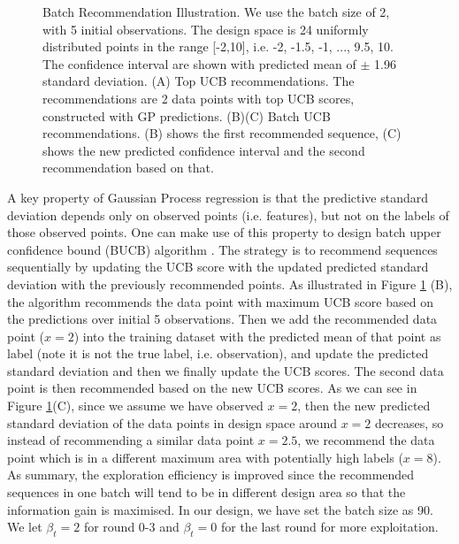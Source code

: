 \begin{figure}
\begin{subfigure}[b]{0.49\textwidth}
    \end{subfigure}
    \caption{Batch Recommendation Illustration. We use the batch size of 2, with 5 initial observations. The design space is 24 uniformly distributed points in the range [-2,10], i.e. {-2, -1.5, -1, ..., 9.5, 10}.
    The confidence interval are shown with predicted mean of $\pm$ 1.96 standard deviation.
    (A) Top UCB recommendations. The recommendations are 2 data points with top UCB scores, constructed with GP predictions. 
    (B)(C) Batch UCB recommendations. (B) shows the first recommended sequence, (C) shows the new predicted confidence interval and the second recommendation based on that.}
    \label{fig:batch rec}
\end{figure}


A key property of Gaussian Process regression is that the predictive standard deviation depends only on observed points (i.e. features), but not on the labels of those observed points. 
One can make use of this property to design batch upper confidence bound (BUCB) algorithm \cite{desautels2014parallelizing}.
The strategy is to recommend sequences sequentially by updating the UCB score with the updated predicted standard deviation with the previously recommended points.
As illustrated in Figure \ref{fig:batch rec} (B), the algorithm recommends the data point with maximum UCB score based on the predictions over initial 5 observations.  
Then we add the recommended data point ($x = 2$) into the training dataset with the predicted mean of that point as label (note it is not the true label, i.e. observation), and update the predicted standard deviation and then we finally update the UCB scores. 
The second data point is then recommended based on the new UCB scores.   
As we can see in Figure \ref{fig:batch rec}(C), since we assume we have observed $x = 2$, then the new predicted standard deviation of the data points in design space around $x =2$  decreases, so instead of recommending a similar data point $x = 2.5$, we recommend the data point which is in a different maximum area with potentially high labels ($x = 8$).     
As summary, the exploration efficiency is improved since the recommended sequences in one batch will tend to be in different design area so that the information gain is maximised. 
In our design, we have set the batch size as 90. We let $\beta_t = 2$ for round 0-3 and $\beta_t = 0$ for the last round for more exploitation.